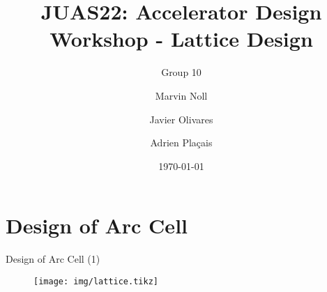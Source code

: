 \documentclass{beamer}
\title[Topic III: Lattice Design]{JUAS22: Accelerator Design Workshop - Lattice Design}
\subtitle{Group 10}
\author[Noll, Olivares, Plaçais]{Marvin Noll \and Javier Olivares \and Adrien Plaçais}
\date[\today]{\today}
\begin{document}
\begin{frame}[plain]
  \titlepage
  \end{frame}

\section{Design of Arc Cell}
\begin{frame}[t]{Design of Arc Cell (1)}
\begin{figure}
\centering
\texttt{[image: img/lattice.tikz]}
\end{figure}
\end{frame}
\end{document}
